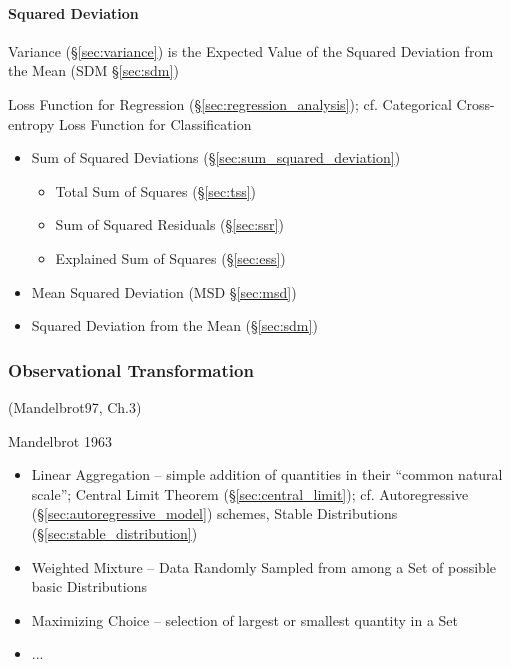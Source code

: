 \paragraph{Squared Deviation}\label{sec:squared_deviation}\hfill

\fist Variance (\S\ref{sec:variance}) is the Expected Value of the Squared
Deviation from the Mean (SDM \S\ref{sec:sdm})

\fist Loss Function for Regression (\S\ref{sec:regression_analysis}); cf.
Categorical Cross-entropy Loss Function for Classification

\begin{itemize}
  \item Sum of Squared Deviations (\S\ref{sec:sum_squared_deviation})
    \begin{itemize}
      \item Total Sum of Squares (\S\ref{sec:tss})
      \item Sum of Squared Residuals (\S\ref{sec:ssr})
      \item Explained Sum of Squares (\S\ref{sec:ess})
    \end{itemize}
  \item Mean Squared Deviation (MSD \S\ref{sec:msd})
  \item Squared Deviation from the Mean (\S\ref{sec:sdm})
\end{itemize}



\subsubsection{Observational Transformation}
\label{sec:observational_transformation}

(Mandelbrot97, Ch.3)

Mandelbrot 1963

\begin{itemize}
  \item Linear Aggregation -- simple addition of quantities in their ``common
    natural scale''; Central Limit Theorem (\S\ref{sec:central_limit}); cf.
    Autoregressive (\S\ref{sec:autoregressive_model}) schemes, Stable
    Distributions (\S\ref{sec:stable_distribution})
  \item Weighted Mixture -- Data Randomly Sampled from among a Set of possible
    basic Distributions
  \item Maximizing Choice -- selection of largest or smallest quantity in a Set
  \item ...
\end{itemize}

